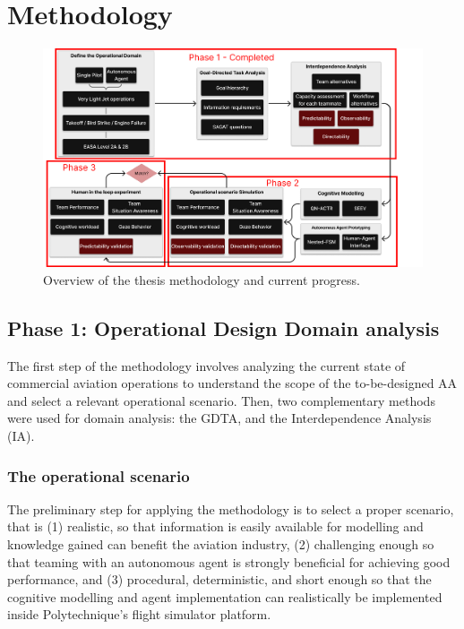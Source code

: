 \documentclass[12pt,a4paper]{article} %
\begin{document}
	\section{Methodology} 

	\begin{figure}[H]
		\centering
		\includegraphics[width=1.1\textwidth]{images/methodology_hat.png}
		\caption{Overview of the thesis methodology and current progress.}
	\end{figure}

	\subsection{Phase 1: Operational Design Domain analysis}
	The first step of the methodology involves analyzing the current state of commercial aviation operations to understand the scope of the to-be-designed AA and select a relevant operational scenario. Then, two complementary methods were used for domain analysis: the GDTA, and the Interdependence Analysis (IA).

	\subsubsection{The operational scenario}
	The preliminary step for applying the methodology is to select a proper scenario, that is (1) realistic, so that information is easily available for modelling and knowledge gained can benefit the aviation industry, (2) challenging enough so that teaming with an autonomous agent is strongly beneficial for achieving good performance, and (3) procedural, deterministic, and short enough so that the cognitive modelling and agent implementation can realistically be implemented inside Polytechnique's flight simulator platform.
	
\end{document}
